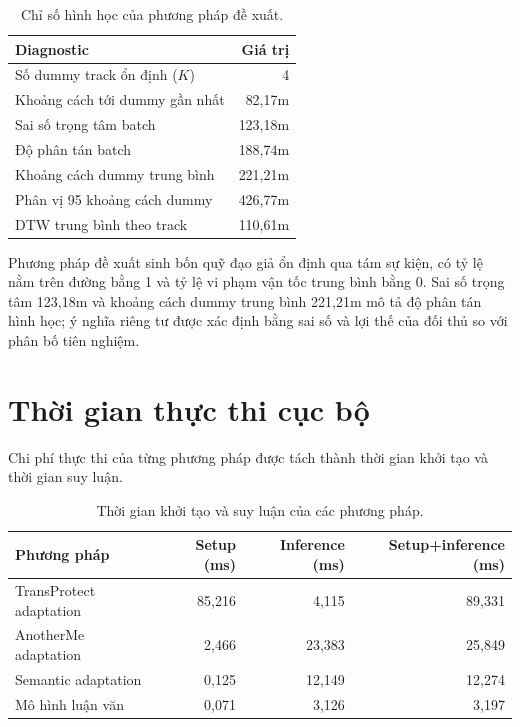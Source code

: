 \documentclass[12pt,a4paper,oneside]{report}
\begin{document}
\begin{table}[htbp]
\centering
\small
\caption{Chỉ số hình học của phương pháp đề xuất.}
\label{tab:thesis-results}
\begin{tabularx}{0.76\textwidth}{Y r}
\toprule
\textbf{Diagnostic} & \textbf{Giá trị} \\
\midrule
Số dummy track ổn định ($K$) & 4 \\
Khoảng cách tới dummy gần nhất & 82,17m \\
Sai số trọng tâm batch & 123,18m \\
Độ phân tán batch & 188,74m \\
Khoảng cách dummy trung bình & 221,21m \\
Phân vị 95 khoảng cách dummy & 426,77m \\
DTW trung bình theo track & 110,61m \\
\bottomrule
\end{tabularx}
\end{table}

Phương pháp đề xuất sinh bốn quỹ đạo giả ổn định qua tám sự kiện, có tỷ lệ nằm trên đường bằng 1 và tỷ lệ vi phạm vận tốc trung bình bằng 0. Sai số trọng tâm 123,18m và khoảng cách dummy trung bình 221,21m mô tả độ phân tán hình học; ý nghĩa riêng tư được xác định bằng sai số và lợi thế của đối thủ so với phân bố tiên nghiệm.

\section{Thời gian thực thi cục bộ}

Chi phí thực thi của từng phương pháp được tách thành thời gian khởi tạo và thời gian suy luận.

\begin{table}[htbp]
\centering
\small
\caption{Thời gian khởi tạo và suy luận của các phương pháp.}
\label{tab:runtime-results}
\begin{tabular}{lrrr}
\toprule
Phương pháp & Setup (ms) & Inference (ms) & Setup+inference (ms) \\
\midrule
TransProtect adaptation & 85,216 & 4,115 & 89,331 \\
AnotherMe adaptation & 2,466 & 23,383 & 25,849 \\
Semantic adaptation & 0,125 & 12,149 & 12,274 \\
Mô hình luận văn & 0,071 & 3,126 & 3,197 \\
\bottomrule
\end{tabular}
\end{table}
\end{document}
